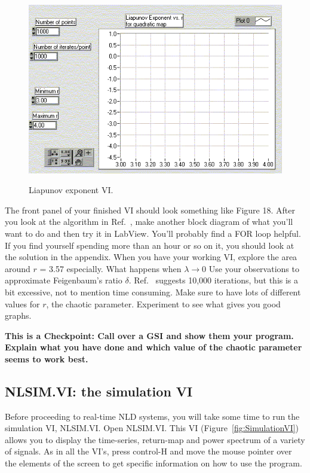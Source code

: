 \documentclass{../lab}
\begin{document}
\begin{figure}[h]
    \centering
    \href{http://experimentationlab.berkeley.edu/sites/default/files/images/Nldimage107.gif}{\includegraphics[width=0.5\linewidth]{images/Nldimage107.png}}
    \caption{Liapunov exponent VI.}
    \label{fig:Nldimage107}
\end{figure}

\newpage

The front panel of your finished VI should look something like Figure 18. After you look at the algorithm in Ref.~\cite{Strogatz}, make another block diagram of what you'll want to do and then try it in LabView. You'll probably find a FOR loop helpful. If you find yourself spending more than an hour or so on it, you should look at the solution in the appendix. When you have your working VI, explore the area around $r$ = 3.57 especially. What happens when $\lambda \rightarrow 0$ Use your observations to approximate Feigenbaum's ratio $\delta$. Ref.~\cite{Strogatz} suggests 10,000 iterations, but this is a bit excessive, not to mention time consuming. Make sure to have lots of different values for $r$, the chaotic parameter. Experiment to see what gives you good graphs.

\textbf{This is a Checkpoint: Call over a GSI and show them your program. Explain what you have done and which value of the chaotic parameter seems to work best.}

\subsection{NLSIM.VI: the simulation VI}

Before proceeding to real-time NLD systems, you will take some time to run the simulation VI, NLSIM.VI. Open NLSIM.VI. This VI (Figure~\ref{fig:SimulationVI}) allows you to display the time-series, return-map and power spectrum of a variety of signals. As in all the VI's, press control-H and move the mouse pointer over the elements of the screen to get specific information on how to use the program.
\end{document}
